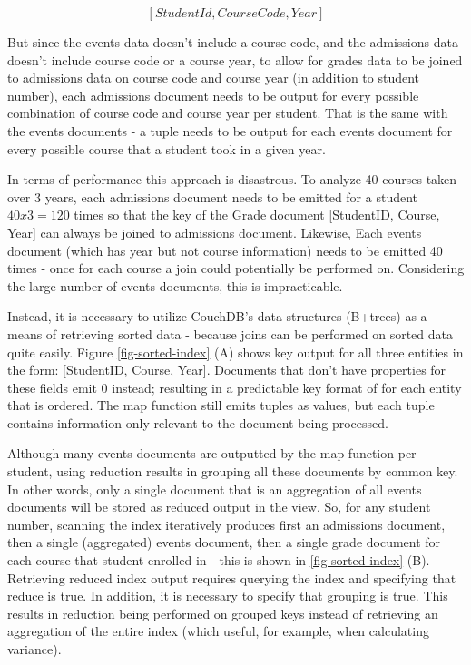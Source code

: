 \[[StudentId,CourseCode,Year]\]

But since the events data doesn't include a course code, and the admissions data doesn't include course code or a course year, to allow for grades data to be joined to admissions data on course code and course year (in addition to student number), each admissions document needs to be output for every possible combination of course code and course year per student. That is the same with the events documents - a tuple needs to be output for each events document for every possible course that a student took in a given year.

In terms of performance this approach is disastrous. To analyze 40 courses taken over 3 years, each admissions document needs to be emitted for a student $40 x 3 = 120$ times so that the key of the Grade document [StudentID, Course, Year] can always be joined to admissions document. Likewise, Each events document (which has year but not course information) needs to be emitted 40 times - once for each course a join could potentially be performed on. Considering the large number of events documents, this is impracticable.

Instead, it is necessary to utilize CouchDB's data-structures (B+trees) as a means of retrieving sorted data - because joins can be performed on sorted data quite easily. Figure \ref{fig-sorted-index} (A) shows key output for all three entities in the form: [StudentID, Course, Year]. Documents that don't have properties for these fields emit 0 instead; resulting in a predictable key format of for each entity that is ordered. The map function still emits tuples as values, but each tuple contains information only relevant to the document being processed.

Although many events documents are outputted by the map function per student, using reduction results in grouping all these documents by common key. In other words, only a single document that is an aggregation of all events documents will be stored as reduced output in the view. So, for any student number, scanning the index iteratively produces first an admissions document, then a single (aggregated) events document, then a single grade document for each course that student enrolled in - this is shown in \ref{fig-sorted-index} (B). Retrieving reduced index output requires querying the index and specifying that reduce is true. In addition, it is necessary to specify that grouping is true. This results in reduction being performed on grouped keys instead of retrieving an aggregation of the entire index (which useful, for example, when calculating variance).

